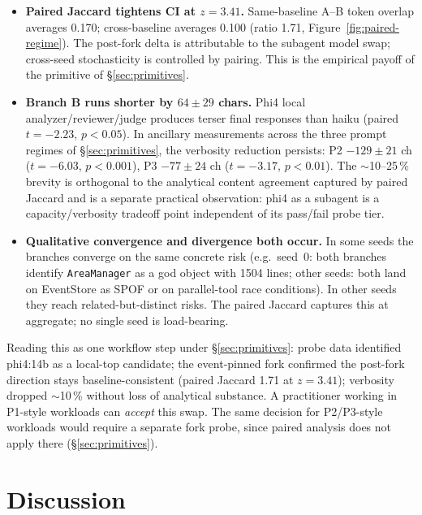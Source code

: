\documentclass[11pt,a4paper]{article}
\begin{document}
\begin{itemize}[leftmargin=*,itemsep=2pt,topsep=2pt]
\item \textbf{Paired Jaccard tightens CI at $z=3.41$.}
      Same-baseline A--B token overlap averages 0.170;
      cross-baseline averages 0.100 (ratio 1.71,
      Figure~\ref{fig:paired-regime}). The post-fork delta
      is attributable to the subagent model swap; cross-seed
      stochasticity is controlled by pairing. This is the
      empirical payoff of the primitive of
      \S\ref{sec:primitives}.
\item \textbf{Branch B runs shorter by $64 \pm 29$ chars.}
      Phi4 local analyzer/reviewer/judge produces terser
      final responses than haiku (paired $t=-2.23$,
      $p<0.05$). In ancillary measurements across the three
      prompt regimes of \S\ref{sec:primitives}, the verbosity
      reduction persists: P2 $-129 \pm 21$ ch ($t=-6.03$,
      $p<0.001$), P3 $-77 \pm 24$ ch ($t=-3.17$, $p<0.01$).
      The $\sim$10--25\,\% brevity is orthogonal to the
      analytical content agreement captured by paired Jaccard
      and is a separate practical observation: phi4 as a
      subagent is a capacity/verbosity tradeoff point
      independent of its pass/fail probe tier.
\item \textbf{Qualitative convergence and divergence both
      occur.} In some seeds the branches converge on the
      same concrete risk (e.g.\ seed~0: both branches
      identify \texttt{AreaManager} as a god object with
      1504 lines; other seeds: both land on EventStore as
      SPOF or on parallel-tool race conditions). In other
      seeds they reach related-but-distinct risks. The
      paired Jaccard captures this at aggregate; no single
      seed is load-bearing.
\end{itemize}

Reading this as one workflow step under
\S\ref{sec:primitives}: probe data identified phi4:14b as a
local-top candidate; the event-pinned fork confirmed the
post-fork direction stays baseline-consistent (paired Jaccard
1.71 at $z=3.41$); verbosity dropped $\sim$10\,\% without
loss of analytical substance. A practitioner working in
P1-style workloads can \emph{accept} this swap. The same
decision for P2/P3-style workloads would require a separate
fork probe, since paired analysis does not apply there
(\S\ref{sec:primitives}).

\section{Discussion}
\label{sec:discussion}
\end{document}
